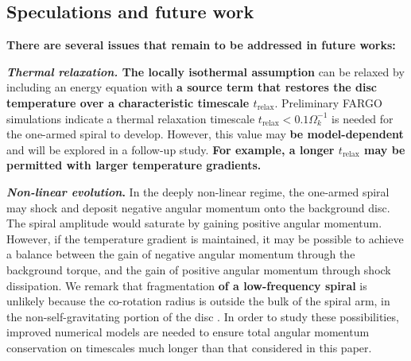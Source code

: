 \subsection{Speculations and future work}

{\bf There are several issues that remain to be addressed in future
  works:} 

{\bf \emph{Thermal relaxation.} The locally isothermal assumption 
} can be relaxed by including an energy equation with
{\bf a source term that restores the disc temperature over a
  characteristic timescale $t_\mathrm{relax}$}. Preliminary FARGO
simulations indicate a thermal relaxation timescale $t_\mathrm{relax} <
0.1\Omega_k^{-1}$ is needed for the one-armed spiral to
develop. However, this value may {\bf be model-dependent} and will be
explored in a follow-up study. {\bf For example,
a longer $t_\mathrm{relax}$ may be permitted with larger temperature
gradients.} 



{\bf \emph{Non-linear evolution}.} In the deeply non-linear regime, the
one-armed spiral may  
shock and deposit negative angular momentum onto 
the background disc. The spiral amplitude would saturate by gaining
positive angular momentum. However, if the temperature gradient is
maintained, it may be possible to achieve a balance between the gain
of negative angular momentum through the background torque, and the
gain of positive angular momentum through shock dissipation. We remark  
that fragmentation {\bf of a low-frequency spiral} is unlikely
because the co-rotation radius is outside the bulk of the spiral arm, in the non-self-gravitating
portion of the disc \citep{durisen08}. In order
to study these possibilities, improved numerical models are needed to
ensure total angular momentum conservation on timescales much longer
than that considered in this paper. 



